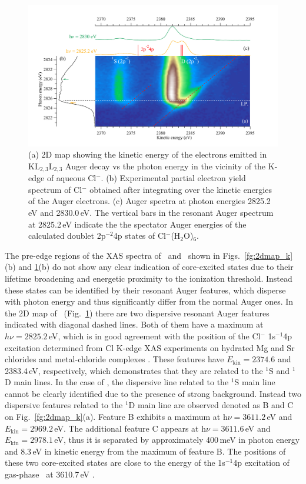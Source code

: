 \begin{figure}[h!]
\centering
\includegraphics[scale=0.55]{figures/cl_2dmap.pdf}
\caption{(a) 2D map showing the kinetic energy of the electrons emitted in KL$_{2,3}$L$_{2,3}$ Auger decay vs the photon energy in the vicinity of the K-edge of aqueous Cl$^{-}$. 
(b) Experimental partial electron yield spectrum of Cl$^{-}$ obtained after integrating over the kinetic energies of the Auger electrons. 
(c) Auger spectra at photon energies 2825.2\,eV and 2830.0\,eV. The vertical bars in the resonant Auger spectrum at 2825.2\,eV indicate the the spectator Auger energies of the calculated doublet 2p$^{-2}$4p states of Cl$^{-}$(H$_2$O)$_6$.}
\label{fg:2dmap_cl}
\end{figure}


The pre-edge regions of the XAS spectra of \ki~and \cli~shown in Figs.\ \ref{fg:2dmap_k}(b) and \ref{fg:2dmap_cl}(b) do not show any clear indication of core-excited states due to their lifetime broadening and energetic proximity to the ionization threshold. Instead these states can be identified by their resonant Auger features, which disperse with photon energy and thus significantly differ from the normal Auger ones. In the 2D map of \cli~(Fig.\ \ref{fg:2dmap_cl}) there are two dispersive resonant Auger features indicated with diagonal dashed lines. Both of them have a maximum at $h\nu =  2825.2$\,eV, which is in good agreement with the position of the Cl$^{-}$ 1s$^{-1}$4p excitation determined from Cl K-edge XAS experiments on hydrated Mg and Sr chlorides\citep{sugiura82:681} and metal-chloride complexes \citep{shadle95:2259}. These features have $E_{\text{kin}} = 2374.6$ and 2383.4\,eV, respectively, which demonstrates that they are related to the $^1$S and $^1$D main lines. In the case of \ki, the dispersive line related to the $^1$S main line cannot be clearly identified due to the presence of strong background. Instead two dispersive features related to the $^1$D main line are observed denoted as B and C on Fig.\ \ref{fg:2dmap_k}(a). Feature B exhibits a maximum at h$\nu = 3611.2$\,eV and $E_{\text{kin}} = 2969.2$\,eV. The additional feature C appears at h$\nu = 3611.6$\,eV and $E_{\text{kin}} = 2978.1$\,eV, thus it is separated by approximately 400\,meV in photon energy and 8.3\,eV in kinetic energy from the maximum of feature B. The positions of these two core-excited states are close to the energy of the 1s$^{-1}$4p excitation of gas-phase \ki~at 3610.7\,eV \citep{hertlein06:062715}.



